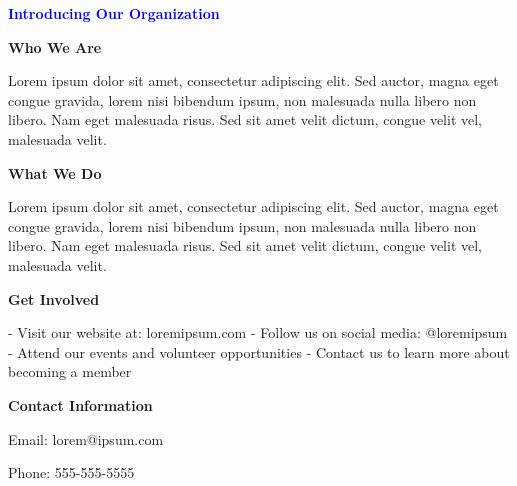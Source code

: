 \documentclass[11pt]{article}
\begin{document}
\begin{center}


\vspace{1cm}

{\Large\textbf{\textcolor{blue}{Introducing Our Organization}}}

\vspace{0.5cm}

{\large\textbf{Who We Are}}

\vspace{0.5cm}

Lorem ipsum dolor sit amet, consectetur adipiscing elit. Sed auctor, magna eget congue gravida, lorem nisi bibendum ipsum, non malesuada nulla libero non libero. Nam eget malesuada risus. Sed sit amet velit dictum, congue velit vel, malesuada velit.

\vspace{1cm}

{\large\textbf{What We Do}}

\vspace{0.5cm}

Lorem ipsum dolor sit amet, consectetur adipiscing elit. Sed auctor, magna eget congue gravida, lorem nisi bibendum ipsum, non malesuada nulla libero non libero. Nam eget malesuada risus. Sed sit amet velit dictum, congue velit vel, malesuada velit.

\vspace{1cm}

{\large\textbf{Get Involved}}

\vspace{0.5cm}

- Visit our website at: loremipsum.com
- Follow us on social media: @loremipsum
- Attend our events and volunteer opportunities
- Contact us to learn more about becoming a member

\vspace{1cm}

{\large\textbf{Contact Information}}

\vspace{0.5cm}

Email: lorem@ipsum.com

Phone: 555-555-5555

\end{center}
\end{document}
